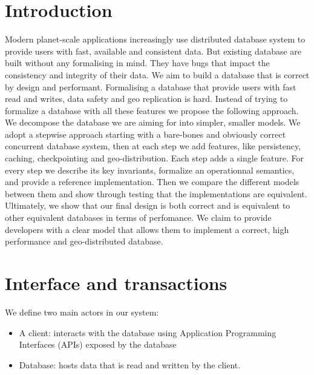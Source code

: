 \documentclass[systeme]{compas2022}
\begin{document}
\section{Introduction}

Modern planet-scale applications increasingly use distributed database system to provide users with fast, available and consistent data.
But existing database are built without any formalising in mind.
They have bugs that impact the consistency and integrity of their data.
We aim to build a database that is correct by design and performant.
Formalising a database that provide users with fast read and writes, data safety and geo replication is hard.
Instead of trying to formalize a database with all these features we propose the following approach.
We decompose the database we are aiming for into simpler, smaller models.
We adopt a stepwise approach starting with a bare-bones and obviously correct concurrent database system, then at each step we add features, like persistency, caching, checkpointing and geo-distribution. 
Each step adds a single feature.
For every step we describe its key invariants, formalize an operationnal semantics, and provide a reference implementation.
Then we compare the different models between them and show through testing that the implementations are equivalent.
Ultimately, we show that our final design is both correct and is equivalent to other equivalent databases in terms of perfomance.
We claim to provide developers with a clear model that allows them to implement a correct, high performance and geo-distributed database.


\section{Interface and transactions}

We define two main actors in our system:
\begin{itemize}
  \item A client: interacts with the database using Application Programming Interfaces (APIs) exposed by the database
  \item Database: hosts data that is read and written by the client.\\
\end{itemize}
\end{document}

